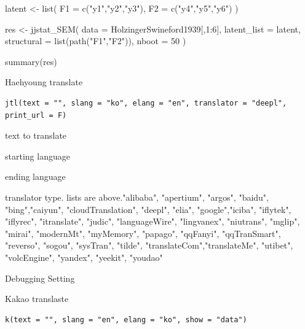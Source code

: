 \documentclass[a4paper]{book}
\begin{document}
%
\begin{Examples}
\begin{ExampleCode}
latent <- list(
  F1 = c("y1","y2","y3"),
  F2 = c("y4","y5","y6")
)

res <- jjstat_SEM(
  data = HolzingerSwineford1939[,1:6],
  latent_list = latent,
  structural = list(path("F1","F2")),
  nboot = 50
)

summary(res)

\end{ExampleCode}
\end{Examples}
%
\begin{Description}
Haehyoung translate
\end{Description}
%
\begin{Usage}
\begin{verbatim}
jtl(text = "", slang = "ko", elang = "en", translator = "deepl", print_url = F)
\end{verbatim}
\end{Usage}
%
\begin{Arguments}
\begin{ldescription}
\item[\code{text}] text to translate

\item[\code{slang}] starting language

\item[\code{elang}] ending language

\item[\code{translator}] translator type. lists are above."alibaba", "apertium", "argos", "baidu", "bing","caiyun", "cloudTranslation", "deepl", "elia", "google","iciba", "iflytek", "iflyrec", "itranslate", "judic", "languageWire", "lingvanex", "niutrans", "mglip", "mirai", "modernMt", "myMemory", "papago", "qqFanyi", "qqTranSmart", "reverso", "sogou", "sysTran", "tilde", "translateCom","translateMe", "utibet", "volcEngine", "yandex", "yeekit", "youdao"

\item[\code{print\_url}] Debugging Setting
\end{ldescription}
\end{Arguments}
%
\begin{Description}
Kakao translaste
\end{Description}
%
\begin{Usage}
\begin{verbatim}
k(text = "", slang = "en", elang = "ko", show = "data")
\end{verbatim}
\end{Usage}
\end{document}
